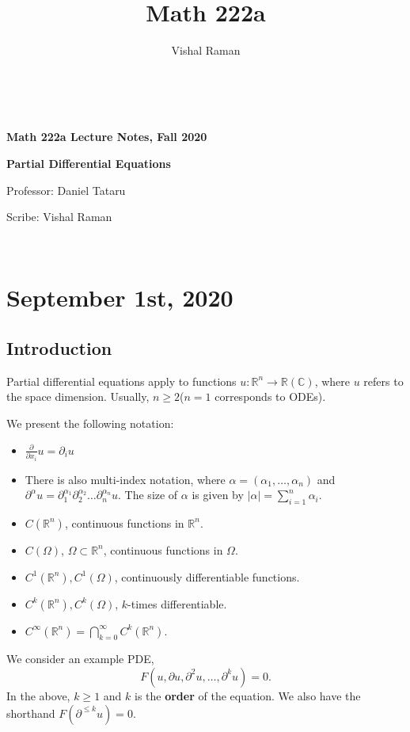 \documentclass[11pt]{scrartcl}
\newcommand{\R}{\mathbb{R}}
\newcommand{\C}{\mathbb C}
\begin{document}
\title{Math 222a}
\author{Vishal Raman}
\thispagestyle{empty}
$ $
\vfill
\begin{center}

\centerline{\huge \textbf{Math 222a Lecture Notes, Fall 2020}}
\centerline{\Large \textbf{Partial Differential Equations} } 
\centerline{Professor: Daniel Tataru}
\centerline{Scribe: Vishal Raman}
\end{center}
\vfill
$ $
\newpage
\thispagestyle{empty}
\tableofcontents
\newpage
\section{September 1st, 2020}
\subsection{Introduction}
Partial differential equations apply to functions $u: \R^n \rightarrow \R(\C)$, where $u$ refers to the space dimension.  Usually, $n \ge 2$($n=1$ corresponds to ODEs).   

We present the following notation: \begin{itemize}
\item $\frac{\partial}{\partial x_i} u = \partial_i u$
\item There is also multi-index notation, where $\alpha = (\alpha_1, \dots, \alpha_n)$ and $\partial^\alpha u = \partial_1^{\alpha_1}\partial_2^{\alpha_2} \dots \partial_n^{\alpha_n} u$.  The size of $\alpha$ is given by $|\alpha| = \sum_{i=1}^n \alpha_i$.
\item $C(\R^n)$, continuous functions in $\R^n$.
\item $C(\Omega)$, $\Omega \subset \R^n$, continuous functions in $\Omega$.
\item $C^1(\R^n), C^1(\Omega)$, continuously differentiable functions.
\item $C^k(\R^n), C^k(\Omega)$, $k$-times differentiable.
\item $C^\infty(\R^n) = \bigcap_{k=0}^{\infty} C^k(\R^n)$.
\end{itemize}

We consider an example PDE, 
$$F(u, \partial u, \partial^2 u, \dots, \partial^k u) = 0.$$
In the above, $k \ge 1$ and $k$ is the \textbf{order} of the equation.  We also have the shorthand $F(\partial ^{\le k}u) = 0$.  
\end{document}
